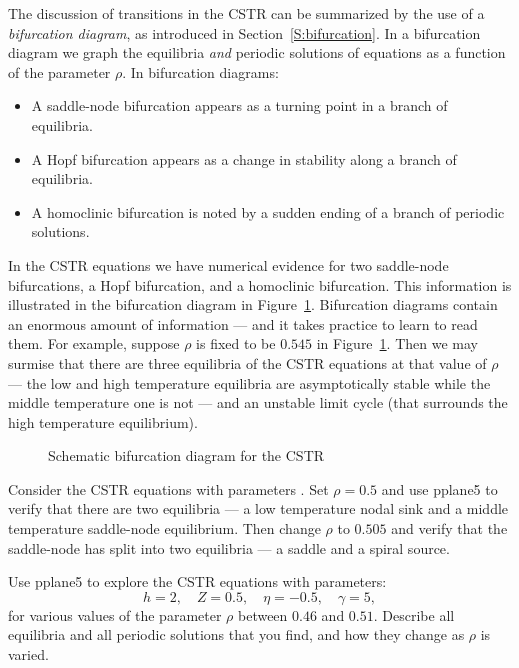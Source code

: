 The discussion of transitions in the 
CSTR can be summarized by the use of a 
{\em bifurcation diagram\/}, as introduced in Section~\ref{S:bifurcation}.  
In a bifurcation diagram we graph the equilibria {\em and\/} periodic 
solutions of equations as a function of the parameter $\rho$.  In 
bifurcation diagrams: 
\begin{itemize}
\item	A saddle-node bifurcation appears as a turning point in 
	a branch of equilibria.
\item	A Hopf bifurcation appears as a change in stability along 
	a branch of equilibria.
\item	A homoclinic bifurcation is noted by a sudden ending of a 
	branch of periodic solutions.
\end{itemize}
In the CSTR equations we have numerical evidence for two saddle-node 
bifurcations, a Hopf bifurcation, and a homoclinic bifurcation.  
This information is illustrated in the bifurcation diagram in 
Figure~\ref{F:CSTRbif}.  Bifurcation diagrams contain an enormous amount 
of information --- and it takes practice to learn to read them.  For 
example, suppose $\rho$ is fixed to be $0.545$ in Figure~\ref{F:CSTRbif}.
Then we may surmise that there are three equilibria of the CSTR equations
at that value of $\rho$ --- the low and high temperature equilibria are 
asymptotically stable while the middle temperature one is not --- and an 
unstable limit cycle (that surrounds the high temperature equilibrium).

\begin{figure}[htb]
           \centerline{%
	   }
           \caption{Schematic bifurcation diagram for the CSTR}
           \label{F:CSTRbif}
\end{figure}


\EXER

\CEXER

\begin{exercise}  \label{E:CSTR5}
Consider the CSTR equations  with parameters 
. Set $\rho=0.5$ and use 
{\sf pplane5} to verify 
that there are two equilibria --- a low temperature nodal sink 
and a middle temperature saddle-node equilibrium.  Then change 
$\rho$ to $0.505$ and verify that the saddle-node has split 
into two equilibria --- a saddle and a spiral source.
\end{exercise}

\begin{exercise} \label{c9.2.2}
Use {\sf pplane5} to explore the CSTR equations  with
parameters:
\[
h=2, \quad Z=0.5, \quad \eta=-0.5, \quad \gamma=5,
\]
for various values of the parameter $\rho$ between $0.46$ and 
$0.51$.  Describe all equilibria and all periodic solutions that 
you find, and how they change as $\rho$ is varied.
\end{exercise}



